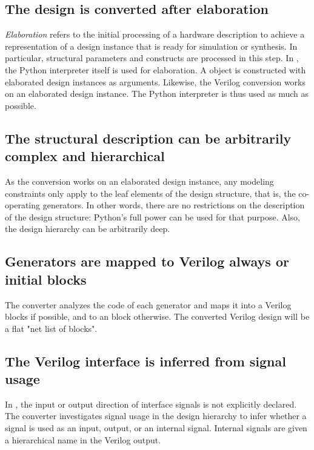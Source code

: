 \subsection{The design is converted after elaboration\label{conv-features-elab}}
\emph{Elaboration} refers to the initial processing of
a hardware description to achieve a representation of a 
design instance that
is ready for simulation or synthesis. In particular, structural
parameters and constructs are processed in this step. In
\myhdl{}, the Python interpreter itself is used for elaboration.
A  object is constructed with elaborated design
instances as arguments.
Likewise, the Verilog conversion works on an
elaborated design instance. The Python interpreter is thus used
as much as possible.

\subsection{The structural description can be arbitrarily complex and hierarchical\label{conv-features-struc}}
As the conversion works on an elaborated design instance, any modeling
constraints only apply to the leaf elements of the design
structure, that is, the co-operating generators. In other words, there
are no restrictions on the description of the design structure:
Python's full power can be used for that purpose. Also, the
design hierarchy can be arbitrarily deep.

\subsection{Generators are mapped to Verilog always or initial blocks\label{conv-features-gen}}
The converter analyzes the code of each generator and maps it
into a Verilog  blocks if possible, and to 
an  block otherwise.
The converted Verilog design will be a flat
"net list of blocks".

\subsection{The Verilog interface is inferred from signal usage\label{conv-features-intf}}
In \myhdl{}, the input or output direction of interface signals
is not explicitly declared. The converter investigates signal usage
in the design hierarchy to infer whether a signal is used as an
input, output, or an internal signal. Internal signals are
given a hierarchical name in the Verilog output.

